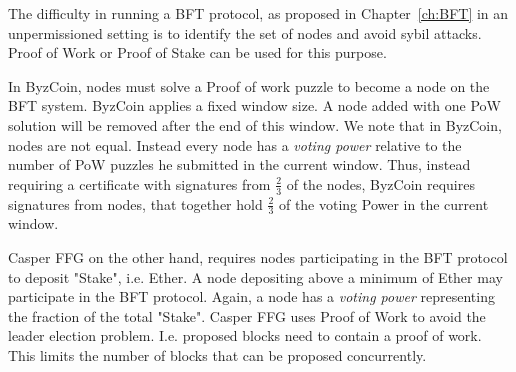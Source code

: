 The difficulty in running a BFT protocol, as proposed in Chapter~\ref{ch:BFT} in an unpermissioned setting is to identify the set of nodes and avoid sybil attacks. Proof of Work or Proof of Stake can be used for this purpose.

In ByzCoin, nodes must solve a Proof of work puzzle to become a node on the BFT system. ByzCoin applies a fixed window size. A node added with one PoW solution will be removed after the end of this window. We note that in ByzCoin, nodes are not equal. Instead every node has a \emph{voting power} relative to the number of PoW puzzles he submitted in the current window. Thus, instead requiring a certificate with signatures from $\frac{2}{3}$ of the nodes, ByzCoin requires signatures from nodes, that together hold $\frac{2}{3}$ of the voting Power in the current window.

Casper FFG on the other hand, requires nodes participating in the BFT protocol to deposit "Stake", i.e. Ether. A node depositing above a minimum of Ether may participate in the BFT protocol. Again, a node has a \emph{voting power} representing the fraction of the total "Stake".
Casper FFG uses Proof of Work to avoid the leader election problem. I.e. proposed blocks need to contain a proof of work. This limits the number of blocks that can be proposed concurrently.
